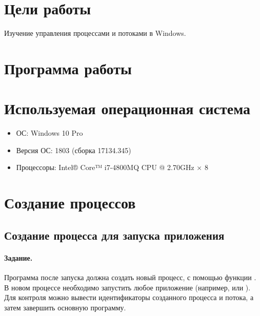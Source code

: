 





\tableofcontents
\newpage

\section{Цели работы}

Изучение управления процессами и потоками в Windows.

\section{Программа работы}



\section{Используемая операционная система}

\begin{itemize}
	\item ОС: Windows 10 Pro
	\item Версия ОС: 1803 (сборка 17134.345)
	\item Процессоры: Intel® Core™ i7-4800MQ CPU @ 2.70GHz × 8
\end{itemize}

\newpage

\section{Создание процессов}

\subsection{Создание процесса для запуска приложения}

\paragraph{Задание.} Программа после запуска должна создать новый процесс, с помощью функции . В новом процессе необходимо запустить любое приложение (например,  или ). Для контроля можно вывести идентификаторы созданного процесса и потока, а затем завершить основную программу.


